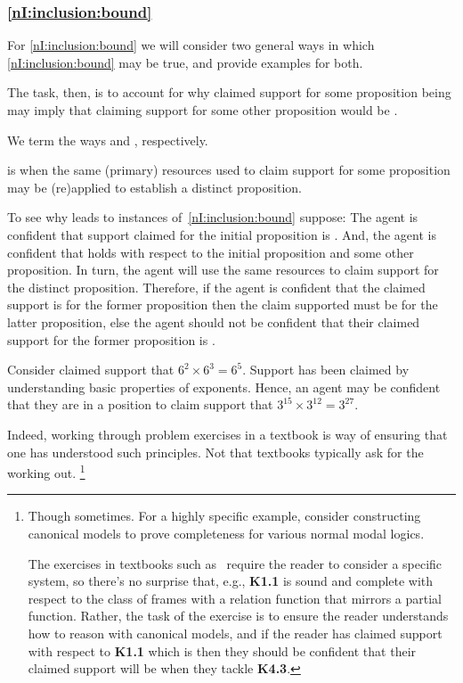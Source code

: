 \subsubsection{\ref{nI:inclusion:bound}}

\begin{note}
  For \ref{nI:inclusion:bound} we will consider two general ways in which \ref{nI:inclusion:bound} may be true, and provide examples for both.

  The task, then, is to account for why claimed support for some proposition being \nmom{} may imply that claiming support for some other proposition would be \nmom{}.

  We term the ways \incl{} and \asso{}, respectively.
\end{note}


\begin{note}[Inclusion]
  \incl{} is when the same (primary) resources used to claim support for some proposition may be (re)applied to establish a distinct proposition.

  To see why \incl{} leads to instances of~\ref{nI:inclusion:bound} suppose:
  The agent is confident that support claimed for the initial proposition is \nmom{}.
  And, the agent is confident that \incl{} holds with respect to the initial proposition and some other proposition.
  In turn, the agent will use the same resources to claim support for the distinct proposition.
  Therefore, if the agent is confident that the claimed support is \nmom{} for the former proposition then the claim supported must be \nmom{} for the latter proposition, else the agent should not be confident that their claimed support for the former proposition is \nmom{}.

  \begin{illustration}
    Consider claimed support that \(6^{2} \times 6^{3} = 6^{5}\).
    Support has been claimed by understanding basic properties of exponents.
    Hence, an agent may be confident that they are in a position to claim support that \(3^{15} \times 3^{12} = 3^{27}\).
  \end{illustration}
  Indeed, working through problem exercises in a textbook is way of ensuring that one has understood such principles.
  Not that textbooks typically ask for the working out.\nolinebreak
  \footnote{
    Though sometimes.
    For a highly specific example, consider constructing canonical models to prove completeness for various normal modal logics.

    The exercises in textbooks such as~ require the reader to consider a specific system, so there's no surprise that, e.g., \textbf{K1.1} is sound and complete with respect to the class of frames with a relation function that mirrors a partial function.
    Rather, the task of the exercise is to ensure the reader understands how to reason with canonical models, and if the reader has claimed support with respect to \textbf{K1.1} which is \nmom{} then they should be confident that their claimed support will be \nmom{} when they tackle \textbf{K4.3}.

}
\end{note}
